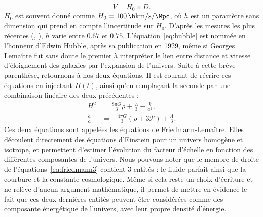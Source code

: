 \documentclass[11pt, twoside, a4paper, openright]{report}
\begin{document}
\begin{equation}
  \label{eq:hubble}
  V = H_0 \times D.
\end{equation}
$H_0$ est souvent donné comme $H_{0} = \SI{100}{\h\km\per\s\per\Mpc}$, où $h$ est un paramètre sans dimension qui prend en compte l'incertitude sur $H_0$. D'après les mesures les plus récentes (\cite{Collaboration2018}, \cite{Riess2019}), $h$ varie entre $\num{0,67}$ et $\num{0,75}$.
L'équation~\ref{eq:hubble} est nommée en l'honneur d'Edwin Hubble, après sa publication en 1929, même si Georges Lemaître fut sans doute le premier à interpréter le lien entre distance et vitesse d'éloignement des galaxies par l'expansion de l'univers.
Suite à cette brève parenthèse, retournons à nos deux équations. Il est courant de récrire ces équations en injectant $H(t)$, ainsi qu'en remplaçant la seconde par une combinaison linéaire des deux précédentes :
\begin{align}
  \label{eq:friedmann3}
  H^2 &= \frac{8 \pi G}{3} \rho + \frac{\Lambda}{3} - \frac{k}{a^2} ,\\
  \label{eq:friedmann4}
  \frac{\ddot{a}}{a} &= - \frac{4 \pi G}{3} (\rho + 3 \mathcal{P}) + \frac{\Lambda}{3} .
\end{align}
Ces deux équations sont appelées les équations de Friedmann-Lemaître. Elles découlent directement des équations d'Einstein pour un univers homogène et isotrope,
et permettent d'estimer l'évolution du facteur d'échelle en fonction des différentes composantes de l'univers.
Nous pouvons noter que le membre de droite de l'équations~\ref{eq:friedmann3} contient 3 entités : le fluide parfait ainsi que la courbure et la constante cosmologique. Même si cela reste un choix d'écriture et ne relève d'aucun argument mathématique, il permet de mettre en évidence le fait que ces deux dernières entités peuvent être considérées comme des composante énergétique de l'univers, avec leur propre densité d'énergie.
\end{document}
